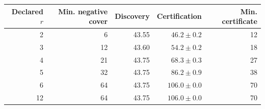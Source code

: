 \begin{tabular}{rrrrr}
\toprule
Declared $r$ & Min. negative cover & Discovery & Certification & Min. certificate \\
\midrule
2 & 6 & 43.55 & $46.2 \pm 0.2$ & 12 \\
3 & 12 & 43.60 & $54.2 \pm 0.2$ & 18 \\
4 & 21 & 43.75 & $68.3 \pm 0.3$ & 27 \\
5 & 32 & 43.75 & $86.2 \pm 0.9$ & 38 \\
6 & 64 & 43.75 & $106.0 \pm 0.0$ & 70 \\
12 & 64 & 43.75 & $106.0 \pm 0.0$ & 70 \\
\bottomrule
\end{tabular}
